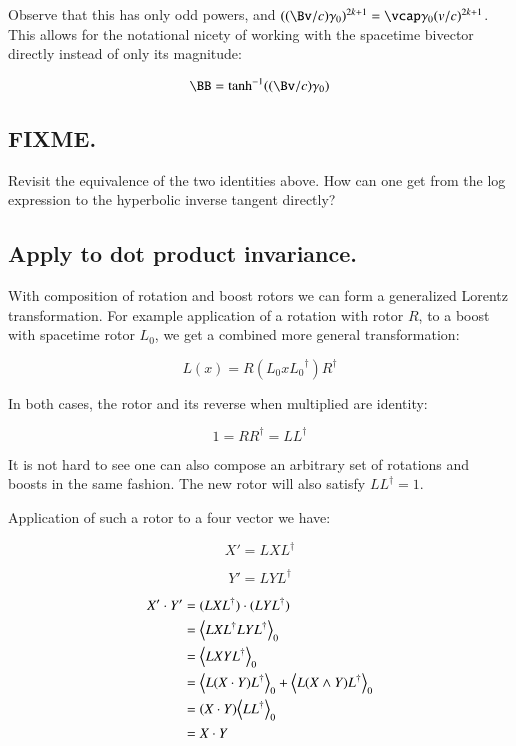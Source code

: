 Observe that this has only odd powers, and $((\Bv/c) \gamma_0)^{2k+1} = \vcap\gamma_0 (v/c)^{2k+1}$.  This allows for the notational nicety of working with the spacetime bivector directly instead of only its magnitude:

\begin{equation}
\BB = \tanh^{-1}((\Bv/c) \gamma_0)
\end{equation}

\subsection{FIXME. }

Revisit the equivalence of the two identities above.  How can one get from the log
expression to the hyperbolic inverse tangent directly?

\subsection{Apply to dot product invariance. }

With composition of rotation and boost rotors we can form a generalized Lorentz transformation.  For example application of a rotation with rotor $R$, to a boost with spacetime rotor $L_0$, we get a combined more general transformation:

\begin{equation*}
L(x) = R ( L_0 x {L_0}^\dagger ) R^\dagger
\end{equation*}

In both cases, the rotor and its reverse when multiplied are identity:

\begin{equation*}
1 = R R^\dagger = L L^\dagger
\end{equation*}

It is not hard to see one can also compose an arbitrary set of rotations and boosts in the same fashion.  The new rotor will also satisfy $L L^\dagger = 1$.

Application of such a rotor to a four vector we have:

\begin{equation*}
X' = L X L^\dagger
\end{equation*}

\begin{equation*}
Y' = L Y L^\dagger
\end{equation*}

\begin{align*}
X' \cdot Y' &= (L X L^\dagger) \cdot (L Y L^\dagger) \\
&= {\left\langle{{ L X L^\dagger L Y L^\dagger }}\right\rangle}_{0} \\
&= {\left\langle{{ L X Y L^\dagger }}\right\rangle}_{0} \\
&= {\left\langle{{ L (X \cdot Y) L^\dagger }}\right\rangle}_{0} + {\left\langle{{ L (X \wedge Y) L^\dagger }}\right\rangle}_{0} \\
&= (X \cdot Y) {\left\langle{{ L L^\dagger }}\right\rangle}_{0} \\
&= X \cdot Y
\end{align*}

